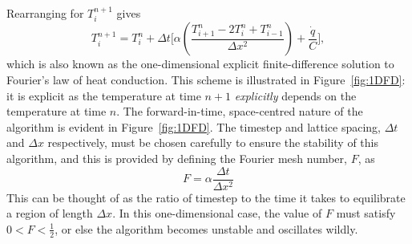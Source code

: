 Rearranging for $T_{i}^{n+1} $ gives
\begin{equation}
T_{i}^{n+1}  = T_{i}^n + \Delta t \bigg[  \alpha \left(\frac{T_{i+1}^{n} - 2T_{i}^n + T_{i-1}^n}{\Delta x^2}\right) + \frac{\dot{q}}{C}  \bigg],
\end{equation}
which is also known as the one-dimensional explicit finite-difference 
solution to Fourier's law of heat conduction. This scheme is illustrated 
in Figure~\ref{fig:1DFD}: it is explicit as the temperature at time $n+1$ 
{\em explicitly} depends on the temperature at time $n$. The 
forward-in-time, space-centred nature of the algorithm is evident in 
Figure~\ref{fig:1DFD}. The timestep and lattice spacing, $\Delta t$ 
and $\Delta x$ respectively, must be chosen carefully to ensure the 
stability of this algorithm, and this is provided by defining the Fourier 
mesh number, $F$, as
\begin{equation}
F = \alpha \frac{\Delta t}{\Delta x^2}
\end{equation}
This can be thought of as the ratio of timestep to the time it takes to 
equilibrate a region of length $\Delta x$. In this one-dimensional 
case, the value of $F$ must satisfy $0 < F < \frac{1}{2}$, or else 
the algorithm becomes unstable and oscillates wildly.

